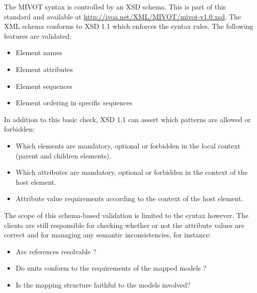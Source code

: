The MIVOT syntax is controlled by an XSD schema.
This is part of this standard and available at \url{http://ivoa.net/XML/MIVOT/mivot-v1.0.xsd}.
The XML schema conforms to XSD 1.1 \citep{std:xsd1.1} which enforces the syntax rules. 
The following features are validated:

\begin{itemize} 
  \item Element names 
  \item Element attributes
  \item Element sequences 
  \item Element ordering in specific sequences
\end{itemize}

In addition to this basic check, XSD 1.1 can assert which patterns are allowed or forbidden:

\begin{itemize} 
  \item Which elements are mandatory, optional  or forbidden in the local context (parent and children elements).
  \item Which attributes are mandatory, optional  or forbidden in the context of the host element.
  \item Attribute value requirements according to the context of the host element.

\end{itemize}
 
The scope of this schema-based validation is limited to the syntax however. 
The clients are still responsible for checking whether or not the attribute values are correct and for managing any semantic inconsistencies, for instance:

\begin{itemize} 
  \item Are references resolvable ? 
  \item Do units conform to the requirements of the mapped models ?
  \item Is the mapping structure faithful to the models involved?
\end{itemize}


